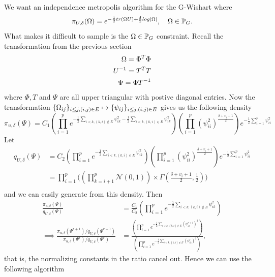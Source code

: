 \documentclass[12pt, leqno]{article}
\providecommand{\abs}[1]{\lvert#1\rvert}
\def\om{\ensuremath\Omega}
\def\pg{\ensuremath\mathbb{P}_{{G}}}
\begin{document}
We want an independence metropolis algorithm for the G-Wishart
where 
\[
\pi_{U,\delta}(\om) = e^{-\frac{1}{2}tr(\om U) + \frac{\delta}{2} log
\abs{\om}}, \quad \om \in \pg.
\]
What makes it difficult to sample is the $\om \in \pg$
constraint. Recall the transformation from the previous section
\begin{align*}
\om = \Phi^T \Phi \\
U^{-1} = T^T T \\
\Psi = \Phi T^{-1} 
\end{align*}
where $\Phi, T$ and $\Psi$ are all upper triangular with postive
diagonal entries. Now the transformation $\{ \om_{ij} \}_{i \leq j,
  (i,j) \in E } \mapsto \{ \psi_{ij} \}_{i \leq j,
  (i,j) \in E }$ gives us the following density
\[
\pi_{u,\delta}(\Psi) = C_1 (\prod_{i=1}^p e^{-\frac{1}{2} 
\sum_{i < k, (k,i) \not\in E} \psi_{ik}^2-\frac{1}{2} 
\sum_{i < k,(k,i) \in E} \psi_{ik}^2}) (\prod_{i=1}^p
  (\psi_{ii}^2)^{\frac{\delta + v_i+1}{2}}) e^{-\frac{1}{2} 
\sum_{i=1}^p \psi_{ii}^2}
\]
Let 
\begin{align*}
q_{U,\delta}(\Psi) &= C_2(\prod_{i=1}^p e^{-\frac{1}{2} 
\sum_{i < k,(k,i) \in E} \psi_{ik}^2}) (\prod_{i=1}^p
  (\psi_{ii}^2)^{\frac{\delta + v_i+1}{2}}) e^{-\frac{1}{2} 
\sum_{i=1}^p \psi_{ii}^2} \\
&= \prod_{i=1}^p  \Big( (\prod_{k=i+1}^p \mathcal{N}(0,1)) \times \Gamma( \frac{\delta +
  v_i+1}{2},\frac{1}{2}) \Big) \\
\end{align*}
and we can easily generate from this density.
Then 
\begin{align*}
\frac{\pi_{u,\delta}(\Psi) }{q_{U,\delta}(\Psi)} &= \frac{C_1}{C_2} (\prod_{i=1}^p e^{-\frac{1}{2} 
\sum_{i < k, (k,i) \not\in E} \psi_{ik}^2}) \\
\implies
  \frac{\pi_{u,\delta}(\Psi^{r+1})/q_{U,\delta}(\Psi^{r+1})}{\pi_{u,\delta}(\Psi^{r})/q_{U,\delta}(\Psi^{r})}
                                                 &= \frac{(\prod_{i=1}^p e^{-\frac{1}{2} 
\sum_{i < k, (k,i) \not\in E} (\psi^{r+1}_{ik})^2})}{(\prod_{i=1}^p e^{-\frac{1}{2} 
\sum_{i < k, (k,i) \not\in E} (\psi^{r}_{ik})^2})},
\end{align*}
that is, the normalizing constants in the ratio cancel out. 
Hence we can use the following algorithm
\end{document}
